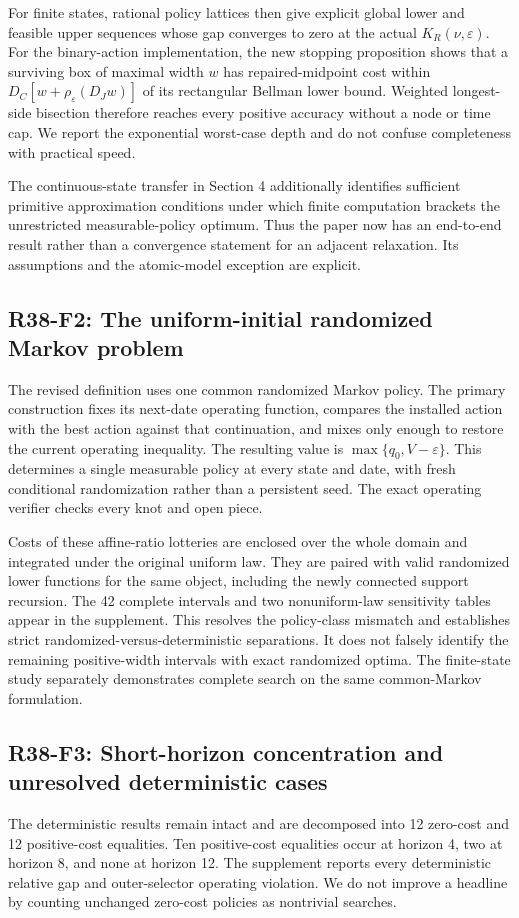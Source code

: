 For finite states, rational policy lattices then give explicit global lower and feasible upper sequences whose gap converges to zero at the actual $K_R(\nu,\varepsilon)$. For the binary-action implementation, the new stopping proposition shows that a surviving box of maximal width $w$ has repaired-midpoint cost within $D_C[w+\rho_\varepsilon(D_Jw)]$ of its rectangular Bellman lower bound. Weighted longest-side bisection therefore reaches every positive accuracy without a node or time cap. We report the exponential worst-case depth and do not confuse completeness with practical speed.

The continuous-state transfer in Section 4 additionally identifies sufficient primitive approximation conditions under which finite computation brackets the unrestricted measurable-policy optimum. Thus the paper now has an end-to-end result rather than a convergence statement for an adjacent relaxation. Its assumptions and the atomic-model exception are explicit.

\subsection{R38-F2: The uniform-initial randomized Markov problem}
The revised definition uses one common randomized Markov policy. The primary construction fixes its next-date operating function, compares the installed action with the best action against that continuation, and mixes only enough to restore the current operating inequality. The resulting value is $\max\{q_0,V-\varepsilon\}$. This determines a single measurable policy at every state and date, with fresh conditional randomization rather than a persistent seed. The exact operating verifier checks every knot and open piece.

Costs of these affine-ratio lotteries are enclosed over the whole domain and integrated under the original uniform law. They are paired with valid randomized lower functions for the same object, including the newly connected support recursion. The 42 complete intervals and two nonuniform-law sensitivity tables appear in the supplement. This resolves the policy-class mismatch and establishes \PrimaryStrict{} strict randomized-versus-deterministic separations. It does not falsely identify the remaining positive-width intervals with exact randomized optima. The finite-state study separately demonstrates complete search on the same common-Markov formulation.

\subsection{R38-F3: Short-horizon concentration and unresolved deterministic cases}
The deterministic results remain intact and are decomposed into 12 zero-cost and 12 positive-cost equalities. Ten positive-cost equalities occur at horizon 4, two at horizon 8, and none at horizon 12. The supplement reports every deterministic relative gap and outer-selector operating violation. We do not improve a headline by counting unchanged zero-cost policies as nontrivial searches.

